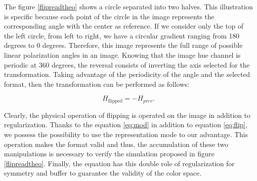 The figure \ref{flipreadtheo} shows a circle separated into two halves.
This illustration is specific because each point of the circle in the image represents the corresponding angle with the center as reference.
If we consider only the top of the left circle, from left to right, we have a circular gradient ranging from 180 degrees to 0 degrees. Therefore, this image represents the full range of possible linear polarization angles in an image.
Knowing that the image hue channel is periodic at 360 degrees, the reversal consists of inverting the axis selected for the transformation.
Taking advantage of the periodicity of the angle and the selected format, then the transformation can be performed as follows:

\begin{equation}\label{eq:flip}
H_{\textrm{flipped}} = -H_{prev}.
\end{equation} 

Clearly, the physical operation of flipping is operated on the image in addition to regularization.
Thanks to the equation \ref{eq:mod} in addition to equation \ref{eq:flip}, we possess the possibility to use the representation mode to our advantage. This operation makes the format valid and thus, the accumulation of these two manipulations is necessary to verify the simulation proposed in figure \ref{flipreadtheo}.
Finally, the equation has this double role of regularization for symmetry and buffer to guarantee the validity of the color space.


